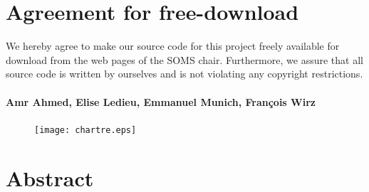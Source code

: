 \documentclass[11pt]{article}
\author{Amr Ahmed, Elise Ledieu, Emmanuel Munich, Fran\c{c}ois Wirz}
\begin{document}

\newpage


\newpage
\section*{Agreement for free-download}
\bigskip


\bigskip


\large We hereby agree to make our source code for this project freely available for download from the web pages of the SOMS chair. Furthermore, we assure that all source code is written by ourselves and is not violating any copyright restrictions.

\begin{center}

\bigskip


\bigskip


\paragraph{Amr Ahmed, Elise Ledieu, Emmanuel Munich, Fran\c{c}ois Wirz}

\end{center}
\newpage



\newpage

\begin{figure}[p]
   \texttt{[image: chartre.eps]}
\end{figure}


\newpage


\tableofcontents

\newpage




\section{Abstract}
\end{document}
